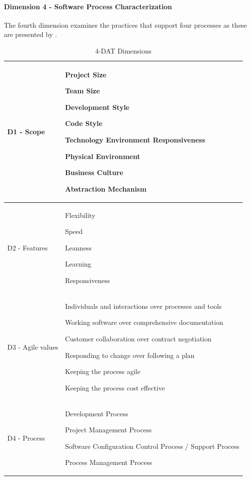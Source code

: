 \paragraph{Dimension 4 - Software Process Characterization}
The fourth dimension examines the practices that support four processes as these are presented by \citet{qumer2006measuring}. 

\begin{table} [H]
\caption{4-DAT Dimensions}
\label{table:4dat_dimensions}
\begin{tabular}{ | p{3cm} | p{11cm} |} \hline
	D1 - Scope & \begin{inparaenum} [a\upshape)]
		\item Project Size
		\item Team Size
		\item Development Style
		\item Code Style
		\item Technology Environment Responsiveness
		\item Physical Environment
		\item Business Culture
		\item Abstraction Mechanism
	\end{inparaenum} \\ \hline
	D2 - Features & \begin{inparaenum} [a\upshape)]
		\item Flexibility
		\item Speed
		\item Leanness
		\item Learning
		\item Responsiveness
	\end{inparaenum} \\ \hline
	D3 - Agile values & \begin{inparaenum} [a\upshape)]
		\item Individuals and interactions over processes and tools
		\item Working software over comprehensive documentation
		\item Customer collaboration over contract negotiation
		\item Responding to change over following a plan
		\item Keeping the process agile
		\item Keeping the process cost effective
	\end{inparaenum} \\ \hline
	D4 - Process & \begin{inparaenum} [a\upshape)]
		\item Development Process
		\item Project Management Process
		\item Software Configuration Control Process / Support Process
		\item Process Management Process
	\end{inparaenum}\\ 
	\hline
\end{tabular}
\end{table}


